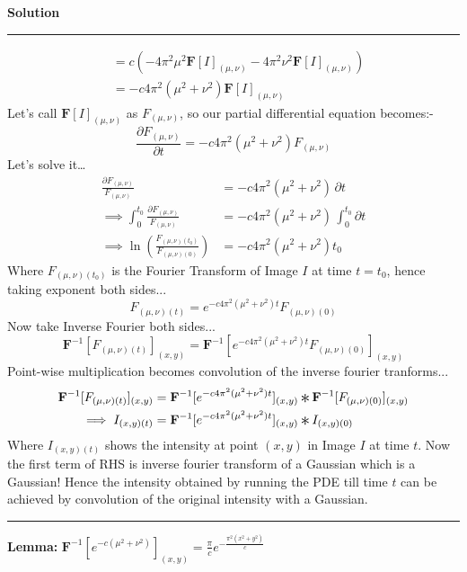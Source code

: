 \documentclass[a4paper]{article}
\newcommand{\Conv}{\mathop{\scalebox{1.5}{\raisebox{-0.2ex}{$\ast$}}}}
\newenvironment{solution}[2][]{%
    \begin{mdframed}[linecolor=green!60!black, linewidth=2pt, roundcorner=10pt, backgroundcolor=green!5!white, skipabove=12pt, skipbelow=12pt]%
        \textbf{\large #2} %
        \par\noindent\rule{\textwidth}{0.4pt} %
        \vspace{0.5em} %
}{%
    \end{mdframed}%
}
\begin{document}
\begin{solution}{Solution}
\begin{align*}
		&= c \left( -4 \pi^2 \mu^2 \mathbf{F}[I]_{(\mu ,\nu)} -4 \pi^2 \nu^2 \mathbf{F}[I]_{(\mu ,\nu)} \right) \\
		&= -c 4 \pi^2(\mu^2 + \nu^2) \mathbf{F}[I]_{(\mu ,\nu)}
	\end{align*}
	Let's call $\mathbf{F}[I]_{(\mu ,\nu)}$ as $F_{(\mu, \nu)}$, so our partial differential equation becomes:-
	\[
		\frac{\partial F_{(\mu, \nu)}}{\partial t} = -c 4 \pi^2(\mu^2 + \nu^2) F_{(\mu ,\nu)}
	\]
	Let's solve it\dots
	\begin{align*}
		\frac{\partial F_{(\mu, \nu)}}{F_{(\mu ,\nu)}} &= -c 4 \pi^2(\mu^2 + \nu^2) \, \partial t \\
		\implies \int_0^{t_0} \frac{\partial F_{(\mu, \nu)}}{F_{(\mu ,\nu)}} &= -c 4 \pi^2(\mu^2 + \nu^2) \, \int_0^{t_0}  \partial t \\
		\implies \ln \left( \frac{F_{(\mu, \nu)(t_0)}}{F_{(\mu, \nu)(0)}} \right) &= -c 4 \pi^2(\mu^2 + \nu^2) t_0
	\end{align*}
	Where $F_{(\mu, \nu)(t_0)}$ is the Fourier Transform of Image $I$ at time $t = t_0$, hence taking exponent both sides...
	\[
		F_{(\mu, \nu)(t)} = e^{-c 4 \pi^2(\mu^2 + \nu^2) t} F_{(\mu, \nu)(0)}
	\]
	Now take Inverse Fourier both sides...
	\[
		\mathbf{F}^{-1} [F_{(\mu, \nu)(t)}]_{(x,y)} = \mathbf{F}^{-1} [e^{-c 4 \pi^2(\mu^2 + \nu^2) t} F_{(\mu, \nu)(0)}]_{(x,y)}
	\]
	Point-wise multiplication becomes convolution of the inverse fourier tranforms...
	\begin{align*}
		\mathbf{F}^{-1} [F_{(\mu, \nu)(t)}]_{(x,y)} &= \mathbf{F}^{-1} [e^{-c 4 \pi^2(\mu^2 + \nu^2) t}]_{(x,y)} \Conv \mathbf{F}^{-1} [F_{(\mu, \nu)(0)}]_{(x,y)}\\
		\implies I_{(x,y)(t)} &= \mathbf{F}^{-1} [e^{-c 4 \pi^2(\mu^2 + \nu^2) t}]_{(x,y)} \Conv I_{(x,y)(0)}
	\end{align*}
	Where $I_{(x,y)(t)}$ shows the intensity at point $(x,y)$ in Image $I$ at time $t$. Now the first term of RHS is inverse fourier transform of a Gaussian which is a Gaussian! Hence the intensity obtained by running the PDE till time $t$ can be achieved by convolution of the original intensity with a Gaussian.
	\vspace{5pt}
	\hrule
	\vspace{5pt}
	\textbf{Lemma:} $\mathbf{F}^{-1} [e^{-c(\mu^2 + \nu^2)}]_{(x,y)} = \frac{\pi}{c} e^{-\frac{\pi^2(x^2 + y^2)}{c}}$


\end{solution}
\end{document}
